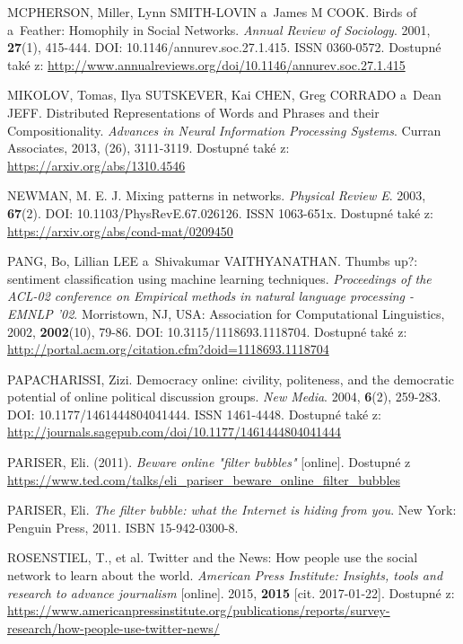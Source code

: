 \documentclass[12pt, a4paper]{article}
\numberwithin{equation}{section} 	%
\begin{document}
\begin{thebibliography}{99}
    MCPHERSON, Miller, Lynn SMITH-LOVIN a~James M COOK. Birds of a~Feather: Homophily in Social Networks. \textit{Annual Review of Sociology}. 2001, \textbf{27}(1), 415-444. DOI: 10.1146/annurev.soc.27.1.415. ISSN 0360-0572. Dostupné také z: \url{http://www.annualreviews.org/doi/10.1146/annurev.soc.27.1.415}

    MIKOLOV, Tomas, Ilya SUTSKEVER, Kai CHEN, Greg CORRADO a~Dean JEFF. Distributed Representations of Words and Phrases and their Compositionality. \textit{Advances in Neural Information Processing Systems}. Curran Associates, 2013, (26), 3111-3119. Dostupné také z: \url{https://arxiv.org/abs/1310.4546}

    NEWMAN, M. E. J. Mixing patterns in networks. \textit{Physical Review E}. 2003, \textbf{67}(2). DOI: 10.1103/PhysRevE.67.026126. ISSN 1063-651x. Dostupné také z: \url{https://arxiv.org/abs/cond-mat/0209450}

    PANG, Bo, Lillian LEE a~Shivakumar VAITHYANATHAN. Thumbs up?: sentiment classification using machine learning techniques. \textit{Proceedings of the ACL-02 conference on Empirical methods in natural language processing - EMNLP '02}. Morristown, NJ, USA: Association for Computational Linguistics, 2002, \textbf{2002}(10), 79-86. DOI: 10.3115/1118693.1118704. Dostupné také z: \url{http://portal.acm.org/citation.cfm?doid=1118693.1118704}

    PAPACHARISSI, Zizi. Democracy online: civility, politeness, and the democratic potential of online political discussion groups. \textit{New Media}. 2004, \textbf{6}(2), 259-283. DOI: 10.1177/1461444804041444. ISSN 1461-4448. Dostupné také z: \url{http://journals.sagepub.com/doi/10.1177/1461444804041444}

    PARISER, Eli. (2011). \textit{Beware online "filter bubbles"} [online]. Dostupné z \url{https://www.ted.com/talks/eli_pariser_beware_online_filter_bubbles}

    PARISER, Eli. \textit{The filter bubble: what the Internet is hiding from you}. New York: Penguin Press, 2011. ISBN 15-942-0300-8.

    ROSENSTIEL, T., et al. Twitter and the News: How people use the social network to learn about the world. \textit{American Press Institute: Insights, tools and research to advance journalism} [online]. 2015, \textbf{2015} [cit. 2017-01-22]. Dostupné z: \url{https://www.americanpressinstitute.org/publications/reports/survey-research/how-people-use-twitter-news/}


\end{thebibliography}
\end{document}
